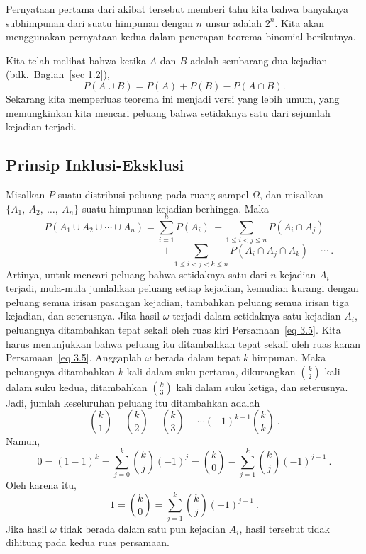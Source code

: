Pernyataan pertama dari akibat tersebut memberi tahu kita bahwa banyaknya subhimpunan
dari suatu himpunan dengan $n$ unsur adalah $2^n$.  Kita akan menggunakan pernyataan
kedua dalam penerapan teorema binomial berikutnya.

Kita telah melihat bahwa ketika $A$ dan $B$ adalah sembarang dua kejadian
(bdk.~Bagian~\ref{sec 1.2}),
$$ P(A \cup B) = P(A) + P(B) - P(A \cap B).
$$ Sekarang kita memperluas teorema ini menjadi versi yang lebih umum, yang memungkinkan
kita mencari peluang bahwa setidaknya satu dari sejumlah kejadian terjadi.

\subsection*{Prinsip Inklusi-Eksklusi}

\begin{theorem}\label{thm 3.10} Misalkan $P$ suatu distribusi peluang pada ruang sampel
$\Omega$, dan misalkan $\{A_1,\ A_2,\ \dots,\ A_n\}$ suatu himpunan kejadian berhingga.
Maka
$$ P(A_1 \cup A_2 \cup \cdots \cup A_n)  =  \sum_{i = 1}^n P(A_i)\ - 
\sum_{1 \leq i < j \leq n} P(A_i \cap A_j) 
$$
\begin{equation} 
\ \ \ \ \ \ \ \ \ \ \ \ \ \ \ \ \ \ \ \ \ \ \ \ \ \ \ \ \ \ \ \ \ \ \ \ \ \ \ \ \ \ \
\ 
\ \ \ \ \ \ \ \ \ \ \ \ \  + \sum_{1 \leq i < j < k \leq n} P(A_i \cap A_j \cap A_k) -
\cdots\ .\label{eq 3.5}
\end{equation}
Artinya, untuk mencari peluang bahwa setidaknya satu dari $n$ kejadian $A_i$ terjadi,
mula-mula jumlahkan peluang setiap kejadian, kemudian kurangi dengan peluang semua irisan
pasangan kejadian, tambahkan peluang semua irisan tiga kejadian, dan seterusnya.
\proof Jika hasil $\omega$ terjadi dalam setidaknya satu kejadian $A_i$, peluangnya
ditambahkan tepat sekali oleh ruas kiri Persamaan~\ref{eq 3.5}.  Kita harus menunjukkan
bahwa peluang itu ditambahkan tepat sekali oleh ruas kanan Persamaan~\ref{eq 3.5}.
Anggaplah $\omega$ berada dalam tepat $k$ himpunan.   Maka peluangnya ditambahkan $k$
kali dalam suku pertama, dikurangkan $k \choose 2$ kali dalam suku kedua, ditambahkan
$k \choose 3$ kali dalam suku ketiga, dan seterusnya.   Jadi, jumlah keseluruhan peluang
itu ditambahkan adalah
$$ {k \choose 1} - {k \choose 2} + {k \choose 3} - \cdots {(-1)^{k-1}} {k \choose k}\ .
$$ Namun,
$$ 0 = (1 - 1)^k = \sum_{j = 0}^k {k \choose j} (-1)^j = {k \choose 0} - \sum_{j = 1}^k
{k \choose j} {(-1)^{j - 1}}\ .
$$ Oleh karena itu,
$$ 1 = {k \choose 0} = \sum_{j = 1}^k {k \choose j} {(-1)^{j - 1}}\ .
$$
Jika hasil $\omega$ tidak berada dalam satu pun kejadian $A_i$, hasil tersebut tidak
dihitung pada kedua ruas persamaan.
\end{theorem}

